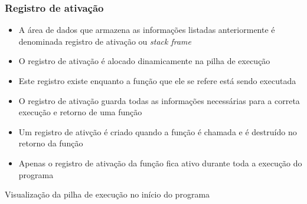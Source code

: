 \begin{frame}

    \frametitle{Registro de ativação}

    \begin{itemize}
        \item A área de dados que armazena as informações listadas 
        anteriormente é denominada {registro de ativação} ou
        {\textit{stack frame}}
        

        \item O registro de ativação é alocado {dinamicamente} na 
        {pilha de execução}
        

        \item Este registro {existe} enquanto a função que ele se 
        refere está sendo {executada}

        \item O registro de ativação {guarda} todas as informações 
        necessárias para a correta {execução} e {retorno} de 
        uma função
        

        \item Um registro de ativção é {criado} quando a função é 
        {chamada} e é destruído no {retorno} da função
        

        \item Apenas o registro de ativação da função  fica 
        {ativo} durante {toda} a execução do programa

    \end{itemize}

\end{frame}

\begin{frame}[fragile]{Visualização da pilha de execução no início do programa}

    \begin{figure}
        \centering


    \end{figure}

\end{frame}

